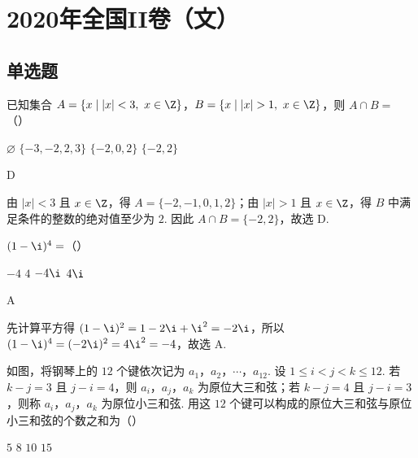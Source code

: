 \chapter{2020年全国II卷（文）}

\section{单选题}

\begin{problem}
已知集合 \(A=\{x\mid \lvert x\rvert<3,\ x\in \Z\}\)，\(B=\{x\mid \lvert x\rvert>1,\ x\in \Z\}\)，则 \(A\cap B=\)（\quad）

\choices
    {\(\varnothing\)}
    {\(\{-3,-2,2,3\}\)}
    {\(\{-2,0,2\}\)}
    {\(\{-2,2\}\)}
\end{problem}

\begin{answer}
D
\end{answer}

\begin{solution}
由 \(\lvert x\rvert<3\) 且 \(x\in\Z\)，得 \(A=\{-2,-1,0,1,2\}\)；由 \(\lvert x\rvert>1\) 且 \(x\in\Z\)，得 \(B\) 中满足条件的整数的绝对值至少为 \(2\). 因此 \(A\cap B=\{-2,2\}\)，故选 D.
\end{solution}

\begin{problem}
\((1-\i)^4=\)（\quad）

\choices
    {\(-4\)}
    {\(4\)}
    {\(-4\i\)}
    {\(4\i\)}
\end{problem}

\begin{answer}
A
\end{answer}

\begin{solution}
先计算平方得 \((1-\i)^2=1-2\i+\i^2=-2\i\)，所以 \((1-\i)^4=(-2\i)^2=4\i^2=-4\)，故选 A.
\end{solution}

\begin{problem}
如图，将钢琴上的 \(12\) 个键依次记为 \(a_1\)，\(a_2\)，\(\cdots\)，\(a_{12}\). 设 \(1\le i<j<k\le 12\). 若 \(k-j=3\) 且 \(j-i=4\)，则 \(a_i\)，\(a_j\)，\(a_k\) 为原位大三和弦；若 \(k-j=4\) 且 \(j-i=3\)，则称 \(a_i\)，\(a_j\)，\(a_k\) 为原位小三和弦. 用这 \(12\) 个键可以构成的原位大三和弦与原位小三和弦的个数之和为（\quad）


\choices
    {\(5\)}
    {\(8\)}
    {\(10\)}
    {\(15\)}
\end{problem}


